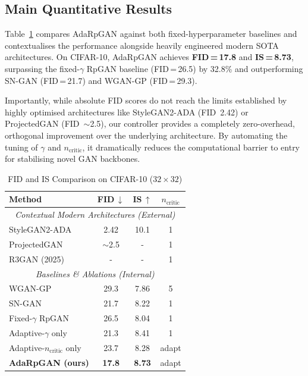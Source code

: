\documentclass[journal]{IEEEtran}
\newcommand{\ncritic}{n_{\mathrm{critic}}}
\begin{document}
\subsection{Main Quantitative Results}

Table~\ref{tab:main_results} compares AdaRpGAN against both fixed-hyperparameter baselines and contextualises the performance alongside heavily engineered modern SOTA architectures.
On CIFAR-10, AdaRpGAN achieves \textbf{FID\,=\,17.8} and \textbf{IS\,=\,8.73}, surpassing the fixed-$\gamma$ RpGAN baseline (FID\,=\,26.5) by 32.8\% and outperforming SN-GAN (FID\,=\,21.7) and WGAN-GP (FID\,=\,29.3).

Importantly, while absolute FID scores do not reach the limits established by highly optimised architectures like StyleGAN2-ADA (FID~2.42) or ProjectedGAN (FID~$\sim$2.5), our controller provides a completely zero-overhead, orthogonal improvement over the underlying architecture. By automating the tuning of $\gamma$ and $\ncritic$, it dramatically reduces the computational barrier to entry for stabilising novel GAN backbones.

\begin{table}[t]
\caption{FID and IS Comparison on CIFAR-10 ($32{\times}32$)}
\label{tab:main_results}
\centering
\begin{tabular}{l c c c}
\toprule
\textbf{Method} & \textbf{FID\,$\downarrow$} & \textbf{IS\,$\uparrow$} & $\ncritic$ \\
\midrule
\multicolumn{4}{c}{\textit{Contextual Modern Architectures (External)}} \\
StyleGAN2-ADA~\cite{karras2020training}       & 2.42 & 10.1 & 1      \\
ProjectedGAN~\cite{sauer2021projected}        & $\sim$2.5 & - & 1      \\
R3GAN (2025)~\cite{kancharla2025r3gan}        & - & - & 1      \\
\midrule
\multicolumn{4}{c}{\textit{Baselines \& Ablations (Internal)}} \\
WGAN-GP~\cite{gulrajani2017improved}          & 29.3 & 7.86 & 5      \\
SN-GAN~\cite{miyato2018spectral}              & 21.7 & 8.22 & 1      \\
Fixed-$\gamma$ RpGAN                          & 26.5 & 8.04 & 1      \\
Adaptive-$\gamma$ only                        & 21.3 & 8.41 & 1      \\
Adaptive-$\ncritic$ only                      & 23.7 & 8.28 & adapt  \\
\textbf{AdaRpGAN (ours)}                      & \textbf{17.8} & \textbf{8.73} & adapt \\
\bottomrule
\end{tabular}
\end{table}
\end{document}
